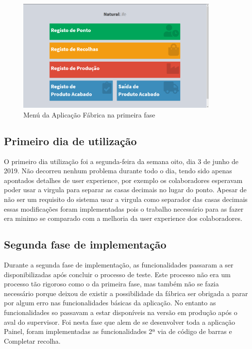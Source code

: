 \begin{figure}[htbp] 
	\begin{center}
		\includegraphics[width=0.90\textwidth,keepaspectratio]{figuras/AppPhp/0-menu_1_fase.png}
		\caption{Menú da Aplicação Fábrica na primeira fase}
		\label{fig:posinstall_fabrica_menu} 
	\end{center}
\end{figure}
\subsection{Primeiro dia de utilização}
O primeiro dia utilização foi a segunda-feira da semana oito, dia 3 de junho de 2019. Não decorreu nenhum problema durante todo o dia, tendo sido apenas apontados detalhes de user experience, por exemplo os colaboradores esperavam poder usar a virgula para separar as casas decimais no lugar do ponto. Apesar de não ser um requisito do sistema usar a virgula como separador das casas decimais essas modificações foram implementadas pois o trabalho necessário para as fazer era minimo se comparado com a melhoria da user experience dos colaboradores.

\subsection{Segunda fase de implementação}
Durante a segunda fase de implementação, as funcionalidades passaram a ser disponibilizadas após concluir o processo de teste. Este processo não era um processo tão rigoroso como o da primeira fase, mas também não se fazia necessário porque deixou de existir a possibilidade da fábrica ser obrigada a parar por algum erro nas funcionalidades básicas da aplicação. No entanto as funcionalidades so passavam a estar disponíveis na versão em produção após o aval do supervisor. Foi nesta fase que alem de se desenvolver toda a aplicação Painel, foram implementadas as funcionalidades 2ª via de código de barras e Completar recolha.

